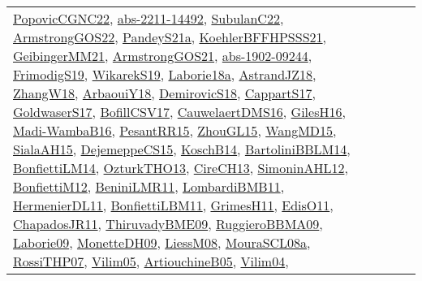 {\begin{longtable}{lp{3cm}>{\raggedright}p{6cm}>{\raggedright}p{6cm}p{8cm}}
\href{papers/PopovicCGNC22.pdf}{PopovicCGNC22}\cite{PopovicCGNC22}, \href{articles/abs-2211-14492.pdf}{abs-2211-14492}\cite{abs-2211-14492}, \href{articles/SubulanC22.pdf}{SubulanC22}\cite{SubulanC22}, \href{papers/ArmstrongGOS22.pdf}{ArmstrongGOS22}\cite{ArmstrongGOS22}, \href{articles/PandeyS21a.pdf}{PandeyS21a}\cite{PandeyS21a}, \href{articles/KoehlerBFFHPSSS21.pdf}{KoehlerBFFHPSSS21}\cite{KoehlerBFFHPSSS21}, \href{papers/GeibingerMM21.pdf}{GeibingerMM21}\cite{GeibingerMM21}, \href{papers/ArmstrongGOS21.pdf}{ArmstrongGOS21}\cite{ArmstrongGOS21}, \href{articles/abs-1902-09244.pdf}{abs-1902-09244}\cite{abs-1902-09244}, \href{papers/FrimodigS19.pdf}{FrimodigS19}\cite{FrimodigS19}, \href{articles/WikarekS19.pdf}{WikarekS19}\cite{WikarekS19}, \href{papers/Laborie18a.pdf}{Laborie18a}\cite{Laborie18a}, \href{papers/AstrandJZ18.pdf}{AstrandJZ18}\cite{AstrandJZ18}, \href{articles/ZhangW18.pdf}{ZhangW18}\cite{ZhangW18}, \href{papers/ArbaouiY18.pdf}{ArbaouiY18}\cite{ArbaouiY18}, \href{papers/DemirovicS18.pdf}{DemirovicS18}\cite{DemirovicS18}, \href{papers/CappartS17.pdf}{CappartS17}\cite{CappartS17}, \href{papers/GoldwaserS17.pdf}{GoldwaserS17}\cite{GoldwaserS17}, \href{papers/BofillCSV17.pdf}{BofillCSV17}\cite{BofillCSV17}, \href{papers/CauwelaertDMS16.pdf}{CauwelaertDMS16}\cite{CauwelaertDMS16}, \href{papers/GilesH16.pdf}{GilesH16}\cite{GilesH16}, \href{papers/Madi-WambaB16.pdf}{Madi-WambaB16}\cite{Madi-WambaB16}, \href{papers/PesantRR15.pdf}{PesantRR15}\cite{PesantRR15}, \href{papers/ZhouGL15.pdf}{ZhouGL15}\cite{ZhouGL15}, \href{articles/WangMD15.pdf}{WangMD15}\cite{WangMD15}, \href{papers/SialaAH15.pdf}{SialaAH15}\cite{SialaAH15}, \href{papers/DejemeppeCS15.pdf}{DejemeppeCS15}\cite{DejemeppeCS15}, \href{papers/KoschB14.pdf}{KoschB14}\cite{KoschB14}, \href{papers/BartoliniBBLM14.pdf}{BartoliniBBLM14}\cite{BartoliniBBLM14}, \href{papers/BonfiettiLM14.pdf}{BonfiettiLM14}\cite{BonfiettiLM14}, \href{articles/OzturkTHO13.pdf}{OzturkTHO13}\cite{OzturkTHO13}, \href{papers/CireCH13.pdf}{CireCH13}\cite{CireCH13}, \href{papers/SimoninAHL12.pdf}{SimoninAHL12}\cite{SimoninAHL12}, \href{papers/BonfiettiM12.pdf}{BonfiettiM12}\cite{BonfiettiM12}, \href{articles/BeniniLMR11.pdf}{BeniniLMR11}\cite{BeniniLMR11}, \href{papers/LombardiBMB11.pdf}{LombardiBMB11}\cite{LombardiBMB11}, \href{papers/HermenierDL11.pdf}{HermenierDL11}\cite{HermenierDL11}, \href{papers/BonfiettiLBM11.pdf}{BonfiettiLBM11}\cite{BonfiettiLBM11}, \href{papers/GrimesH11.pdf}{GrimesH11}\cite{GrimesH11}, \href{papers/EdisO11.pdf}{EdisO11}\cite{EdisO11}, \href{papers/ChapadosJR11.pdf}{ChapadosJR11}\cite{ChapadosJR11}, \href{papers/ThiruvadyBME09.pdf}{ThiruvadyBME09}\cite{ThiruvadyBME09}, \href{articles/RuggieroBBMA09.pdf}{RuggieroBBMA09}\cite{RuggieroBBMA09}, \href{papers/Laborie09.pdf}{Laborie09}\cite{Laborie09}, \href{papers/MonetteDH09.pdf}{MonetteDH09}\cite{MonetteDH09}, \href{articles/LiessM08.pdf}{LiessM08}\cite{LiessM08}, \href{papers/MouraSCL08a.pdf}{MouraSCL08a}\cite{MouraSCL08a}, \href{papers/RossiTHP07.pdf}{RossiTHP07}\cite{RossiTHP07}, \href{papers/Vilim05.pdf}{Vilim05}\cite{Vilim05}, \href{papers/ArtiouchineB05.pdf}{ArtiouchineB05}\cite{ArtiouchineB05}, \href{papers/Vilim04.pdf}{Vilim04}\cite{Vilim04}, 
\end{longtable}}
